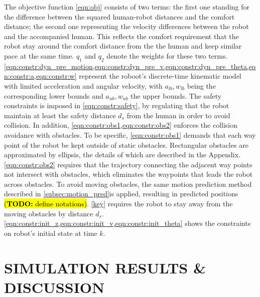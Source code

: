 \documentclass[letterpaper, 10 pt, conference]{ieeeconf}
\newcommand{\todohere}[1]{\hl{(\textbf{TODO:} #1)}}
\begin{document}
	The objective function \cref{eqn:obj} consists of two terms: the first one standing for the difference between the squared human-robot distances and the comfort distance; the second one representing the velocity differences between the robot and the accompanied human.
	This reflects the comfort requirement that the robot stay around the comfort distance from the the human and keep similar pace at the same time.
	$q_1$ and $q_2$ denote the weights for these two terms.
	\cref{eqn:constr:dyn_pre_motion,eqn:constr:dyn_pre_v,eqn:constr:dyn_pre_theta,eqn:constr:a,eqn:constr:w} represent the roboot's discrete-time kinematic model with limited acceleration and angular velocity, with $a_{lb},w_{lb}$ being the corresponding lower bounds and $a_{ub},w_{ub}$ the upper bounds.
	The safety constraints is imposed in \cref{eqn:constr:safety}, by regulating that the robot maintain at least the safety distance $d_s$ from the human in order to avoid collision.
	In addition, \cref{eqn:constr:obs1,eqn:constr:obs2} enforces the collision avoidance with obstacles.
	To be specific, \cref{eqn:constr:obs1} demands that each way point of the robot be kept outside of static obstacles.
	Rectangular obstacles are approximated by ellipsis, the details of which are described in the Appendix.
	\cref{eqn:constr:obs2} requires that the trajectory connecting the adjacent way points not intersect with obstacles, which eliminates the waypoints that leads the robot across obstacles.
	To avoid moving obstacles, the same motion prediction method described in \cref{subsec:motion_pred}is applied, resulting in predicted positions \todohere{define notations}.
	\cref{key} requires the robot to stay away from the moving obstacles by distance $d_s$.
	\cref{eqn:constr:init_z,eqn:constr:init_v,eqn:constr:init_theta} shows the constraints on robot's initial state at time $k$.
	
	
	\section{SIMULATION RESULTS \& DISCUSSION}\label{sec:results}
\end{document}
